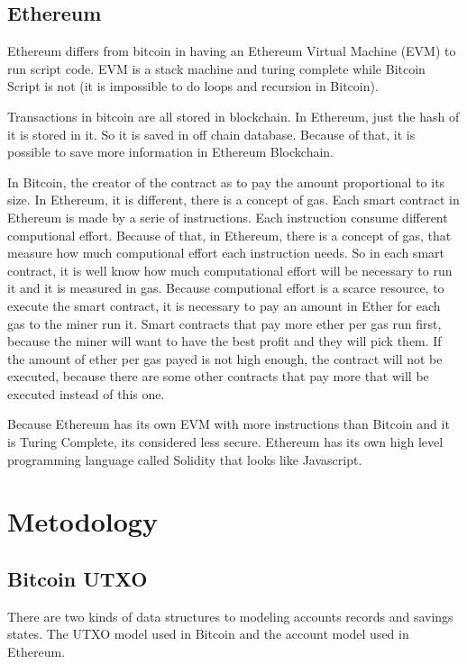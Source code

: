 \documentclass[12pt]{article}
\begin{document}
\subsection{Ethereum}

Ethereum differs from bitcoin in having an Ethereum Virtual Machine (EVM) to run script code.
EVM is a stack machine and turing complete while Bitcoin Script is not
(it is impossible to do loops and recursion in Bitcoin).

Transactions in bitcoin are all stored in blockchain.
In Ethereum, just the hash of it is stored in it.
So it is saved in off chain database.
Because of that, it is possible to save more information in Ethereum Blockchain.

In Bitcoin, the creator of the contract as to pay the amount proportional to its size.
In Ethereum, it is different, there is a concept of gas.
Each smart contract in Ethereum is made by a serie of instructions.
Each instruction consume different computional effort.
Because of that, in Ethereum, there is a concept of gas, that measure how much computional effort
each instruction needs.
So in each smart contract, it is well know how much computational effort will be necessary to run it
and it is measured in gas.
Because computional effort is a scarce resource, to execute the smart contract, it is necessary to
pay an amount in Ether for each gas to the miner run it.
Smart contracts that pay more ether per gas run first, because the miner will want to have the best
profit and they will pick them.
If the amount of ether per gas payed is not high enough, the contract will not be executed,
because there are some other contracts that pay more that will be executed instead of this one.

Because Ethereum has its own EVM with more instructions than Bitcoin and it is Turing Complete,
its considered less secure.
Ethereum has its own high level programming language called Solidity that looks like Javascript.

\section{Metodology}

\subsection{Bitcoin UTXO}

There are two kinds of data structures to modeling accounts records and savings states.
The UTXO model used in Bitcoin and the account model used in Ethereum.
\end{document}
